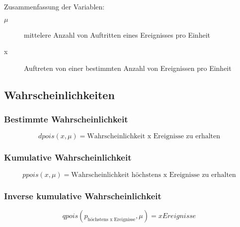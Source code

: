 \documentclass[a4paper,10pt]{article}
\begin{document}
Zusammenfassung der Variablen:
\begin{description}
\item[$ \mu $] mittelere Anzahl von Auftritten eines Ereignisses pro
  Einheit
\item[x] Auftreten von einer bestimmten Anzahl von Ereignissen pro
  Einheit
\end{description}

\subsection{Wahrscheinlichkeiten}
\subsubsection{Bestimmte Wahrscheinlichkeit}
\begin{equation}
  \label{eq:7}
  dpois(x, \mu) = \text{Wahrscheinlichkeit x Ereignisse zu erhalten}
\end{equation}

\subsubsection{Kumulative Wahrscheinlichkeit}
\begin{equation}
  \label{eq:8}
  ppois(x, \mu) = \text{Wahrscheinlichkeit höchstens x Ereignisse zu erhalten}
\end{equation}

\subsubsection{Inverse kumulative Wahrscheinlichkeit}
\begin{equation}
  \label{eq:9}
  qpois(p_{\text {höchstens x Ereignisse}}, \mu) = x Ereignisse
\end{equation}
\end{document}
